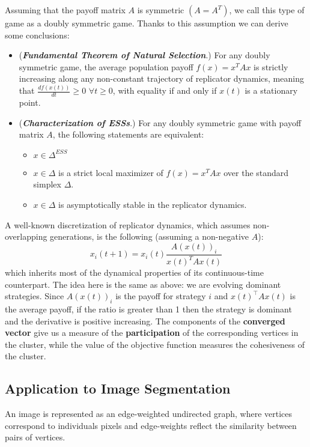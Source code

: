 Assuming that the payoff matrix $A$ is symmetric $(A = A^T)$, we call this type of game as a doubly symmetric game. Thanks to this assumption we can derive some conclusions:
\begin{itemize}
	\item (\textbf{\textit{Fundamental Theorem of Natural Selection}}.) For any doubly symmetric game, the average population payoff $f(x) = x^TAx$ is strictly increasing along any non-constant trajectory of replicator dynamics, meaning that $\frac{df(x(t))}{dt} \geq 0$ $\forall t \geq0$, with equality if and only if $x(t)$ is a stationary point.
	\item (\textit{\textbf{Characterization of ESSs}}.) For any doubly symmetric game with payoff matrix $A$, the following statements are equivalent:
	\begin{itemize}
		\item $x\in \Delta^{ESS}$
		\item $x \in \Delta$ is a strict local maximizer of $f(x) = x^TAx$ over the standard simplex $\Delta$.
		\item $x\in\Delta$ is asymptotically stable in the replicator dynamics.
	\end{itemize}
\end{itemize}


A well-known discretization of replicator dynamics, which assumes non-overlapping generations, is the following (assuming a non-negative $A$): 
$$
x_i(t+1) = x_i(t)\frac{A(x(t))_i}{x(t)^TAx(t)}
$$
which inherits most of the dynamical properties of its continuous-time counterpart. The idea here is the same as above: we are evolving dominant strategies. Since $A(x(t))_i$ is the payoff for strategy $i$ and $x(t)^\top Ax(t)$ is the average payoff, if the ratio is greater than 1 then the strategy is dominant and the derivative is positive increasing.
The components of the \textbf{converged vector} give us a measure of the \textbf{participation} of the corresponding vertices in the cluster, while the value of the objective function measures the cohesiveness of the cluster.

\subsection{Application to Image Segmentation}
An image is represented as an edge-weighted undirected graph, where vertices correspond to individuals pixels and edge-weights reflect the similarity between pairs of vertices.

